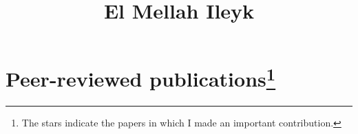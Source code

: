 
\renewcommand*\rmdefault{iwona}

\renewcommand \thesection{\colorulem[red]{\Roman{section}}}
\renewcommand \thesubsection{\Roman{section}.\colorulem[green]{\arabic{subsection}}}

\newcommand{\horrule}[1]{\rule{\linewidth}{#1}} %

\title{	
\vspace*{-2cm}
\normalfont \normalsize 
El Mellah Ileyk \\ [25pt] %
}
%
%
\date{} %




\maketitle
\thispagestyle{empty}
\vspace*{-3cm}
\section*{Peer-reviewed publications\footnote{The stars indicate the papers in which I made an important contribution.}}

